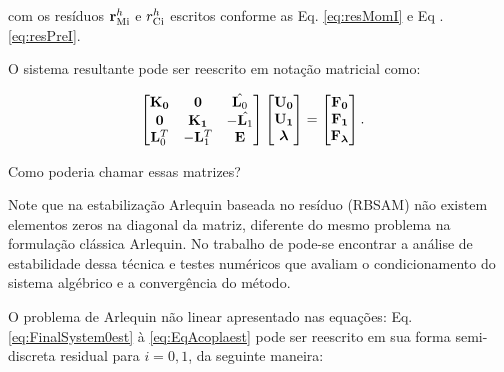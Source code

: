 \documentclass[tese_patricia]{subfiles}
\begin{document}
\noindent com os resíduos $\mathbf{r}_{\mathrm{Mi}}^{h}$ e $r_{\mathrm{Ci}}^{h}$ escritos conforme as Eq. \ref{eq:resMomI} e Eq .\ref{eq:resPreI}.

O sistema resultante pode ser reescrito em notação matricial como:

\begin{align}
	\begin{bmatrix}
		\mathbf{K_{0}} & \mathbf{0} & \hat{\mathbf{L}_{0}} \\
		\mathbf{0} & \mathbf{K_{1}} & - \hat{\mathbf{L}_{1}} \\
		\mathbf{L}_{0}^{T} & -\mathbf{L}_{1}^{T} & \mathbf{E}
	\end{bmatrix}
	\begin{bmatrix}
		\mathbf{U_{0}} \\
		\mathbf{U_{1}} \\
		\boldsymbol{\lambda}
	\end{bmatrix}
	&=
	\begin{bmatrix}
		\mathbf{F_{0}} \\
		\mathbf{F_{1}} \\
		\mathbf{F_{\boldsymbol{\lambda}}}
	\end{bmatrix}.
	\label{eq:sistema_linear}
\end{align}	

Como poderia chamar essas matrizes?

Note que na estabilização Arlequin baseada no resíduo (RBSAM) não existem elementos zeros na diagonal da matriz, diferente do mesmo problema na formulação clássica Arlequin. No trabalho de  pode-se encontrar a análise de estabilidade dessa técnica e testes numéricos que avaliam o condicionamento do sistema algébrico e a convergência do método.

O problema de Arlequin não linear apresentado nas equações: Eq. \ref{eq:FinalSystem0est} à \ref{eq:EqAcoplaest} pode ser reescrito em sua forma semi-discreta residual para $i=0,1$, da seguinte maneira:
\end{document}
